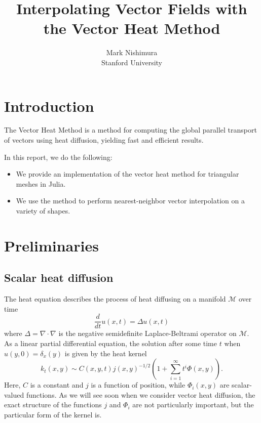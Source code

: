 \documentclass{article}
\title{Interpolating Vector Fields with the Vector Heat Method}
\author{
  Mark Nishimura \\  Stanford University
}
\begin{document}
\maketitle


\section{Introduction}
The Vector Heat Method \cite{Sharp:2019:VHM} is a method for computing the
global parallel transport of vectors using heat diffusion, yielding fast and
efficient results.

In this report, we do the following:
\begin{itemize}
  \item We provide an implementation of the vector heat method for triangular meshes in Julia.
  \item We use the method to perform nearest-neighbor vector interpolation on a variety of shapes.
\end{itemize}

\section{Preliminaries}
\subsection{Scalar heat diffusion}
The heat equation describes the process of heat diffusing on a manifold $\mathcal{M}$ over time
\begin{equation}\label{eqn:heat}
  \frac{d}{dt}u(x,t) = \Delta u(x, t)
\end{equation}
where $\Delta = \nabla \cdot \nabla$ is the negative semidefinite
Laplace-Beltrami operator on $\mathcal{M}$. As a linear partial differential
equation, the solution after some time $t$ when $u(y, 0) = \delta_{x}(y)$ is given
by the heat kernel
\begin{equation}\label{eqn:scalarheatkernel}
  k_{t}(x, y) \sim C(x, y, t)j(x, y)^{-1/2} \left(1 + \sum_{i=1}^{\infty}t^{i}\Phi(x, y)\right).
\end{equation}
Here, $C$ is a constant and $j$ is a function of position, while $\Phi_{i}(x, y)$
are scalar-valued functions. As we will see soon when we consider vector heat diffusion, the exact structure of the
functions $j$ and $\Phi_{i}$ are not particularly important, but the particular
form of the kernel is.
\end{document}
